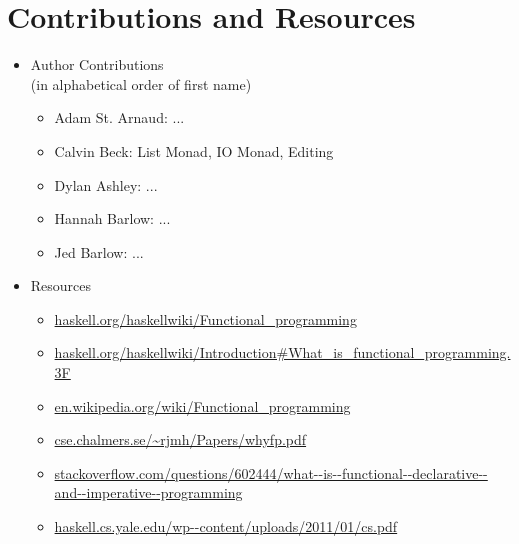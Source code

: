 \documentclass[]{beamer}
\begin{document}
\begin{frame}
\maketitle
\end{frame}





\section{Contributions and Resources}
\begin{frame}[fragile]
    \begin{itemize}
        \item Author Contributions\\{\scriptsize(in alphabetical order of first name)}
            \begin{itemize}
                \item Adam St. Arnaud:
                    ...
                \item Calvin Beck:
                    List Monad, IO Monad, Editing
                \item Dylan Ashley:
                    ...
                \item Hannah Barlow:
                    ...
                \item Jed Barlow:
                    ...
            \end{itemize}
        \item Resources
            \begin{itemize}
                \item \url{haskell.org/haskellwiki/Functional_programming}
                \item \url{haskell.org/haskellwiki/Introduction#What_is_functional_programming.3F}
                \item \url{en.wikipedia.org/wiki/Functional_programming}
                \item \url{cse.chalmers.se/~rjmh/Papers/whyfp.pdf}
                \item \url{stackoverflow.com/questions/602444/what--is--functional--declarative--and--imperative--programming}
                \item \url{haskell.cs.yale.edu/wp--content/uploads/2011/01/cs.pdf}
            \end{itemize}
    \end{itemize}
\end{frame}
\end{document}
